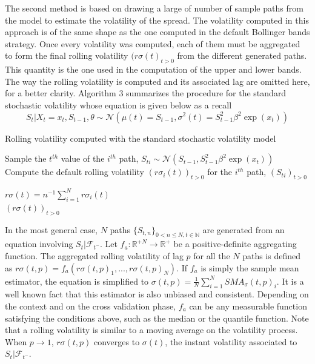 \documentclass[11pt,a4,twosided,singlespacing,titlepagenumber=on]{scrreprt}
\numberwithin{equation}{chapter} %
\theoremstyle{remark}
\begin{document}
The second method is based on drawing a large of number of sample paths from the model to estimate the volatility of the spread. The volatility computed in this approach is of the same shape as the one computed in the default Bollinger bands strategy. Once every volatility was computed, each of them must be aggregated to form the final rolling volatility $(r\sigma(t)_{t>0}$ from the different generated paths. This quantity is the one used in the computation of the upper and lower bands. The way the rolling volatility is computed and its associated lag are omitted here, for a better clarity. Algorithm 3 summarizes the procedure for the standard stochastic volatility whose equation is given below as a recall
\begin{equation}
S_t | X_t = x_t, S_{t-1}, \theta \sim \mathcal{N}(\mu(t) = S_{t-1}, \sigma^2(t)= S_{t-1}^2 \beta^2 \exp(x_t))
\end{equation}

\begin{algorithm}
\caption{Rolling volatility computed with the standard stochastic volatility model}\label{volatility_std_sv}
\begin{algorithmic}[1]

		\State Sample the $t^{th}$ value of the $i^{th}$ path, $S_{ti} \sim \mathcal{N}(S_{t-1}, S_{t-1}^2 \beta^2 \exp(x_t))$
	\State Compute the default rolling volatility $(r\sigma_i(t))_{t>0}$ for the $i^{th}$ path, $(S_{ti})_{t>0}$

	\State $\displaystyle{r\sigma(t) = n^{-1} \sum_{i=1}^N r\sigma_i(t)}$
\\
\Return $(r\sigma(t))_{t>0}$
\EndProcedure
\end{algorithmic}
\end{algorithm}


In the most general case, $N$ paths $\{S_{t,n}\}_{0 < n \leq N, t \in \mathbb{N}}$ are generated from an equation involving $S_t | \mathcal{F}_{t^-}$. Let $f_a : \mathbb{R}^{+N} \rightarrow \mathbb{R}^+$ be a positive-definite aggregating function. The aggregated rolling volatility of lag $p$ for all the $N$ paths is defined as $r\sigma(t,p) = f_a(r\sigma(t, p)_1,...,r\sigma(t, p)_N)$.
If $f_a$ is simply the sample mean estimator, the equation is simplified to
$\sigma(t,p) = \frac{1}{N}\sum_{i=1}^N SMA_\sigma(t, p)_i$. It is a well known fact that this estimator is also unbiased and consistent. Depending on the context and on the cross validation phase, $f_a$ can be any measurable function satisfying the conditions above, such as the median or the quantile function.
Note that a rolling volatility is similar to a moving average on the volatility process. When $p \rightarrow 1$, $r\sigma(t,p)$ converges to $\sigma(t)$, the instant volatility associated to $S_t | \mathcal{F}_{t^-}$.
\end{document}
